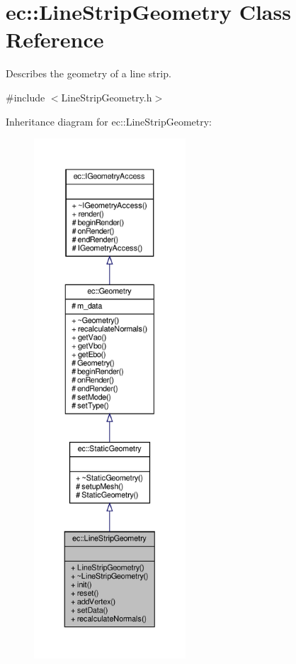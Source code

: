 \hypertarget{classec_1_1_line_strip_geometry}{}\section{ec\+:\+:Line\+Strip\+Geometry Class Reference}
\label{classec_1_1_line_strip_geometry}


Describes the geometry of a line strip.  




{\ttfamily \#include $<$Line\+Strip\+Geometry.\+h$>$}



Inheritance diagram for ec\+:\+:Line\+Strip\+Geometry\+:\nopagebreak
\begin{figure}[H]
\begin{center}
\leavevmode
\includegraphics[height=550pt]{classec_1_1_line_strip_geometry__inherit__graph}
\end{center}
\end{figure}


